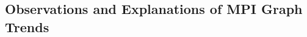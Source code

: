 \documentclass{article}
\begin{document}
    \subsection{Observations and Explanations of MPI Graph Trends}
    
    
    
\end{document}
